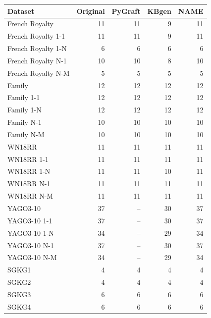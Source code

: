\begin{tabular}{lrrrr}
\toprule
Dataset & Original & PyGraft & KBgen & NAME \\
\midrule
French Royalty & 11 & 11 & 9 & 11 \\
French Royalty 1-1 & 11 & 11 & 9 & 11 \\
French Royalty 1-N & 6 & 6 & 6 & 6 \\
French Royalty N-1 & 10 & 10 & 8 & 10 \\
French Royalty N-M & 5 & 5 & 5 & 5 \\
\midrule
Family & 12 & 12 & 12 & 12 \\
Family 1-1 & 12 & 12 & 12 & 12 \\
Family 1-N & 12 & 12 & 12 & 12 \\
Family N-1 & 10 & 10 & 10 & 10 \\
Family N-M & 10 & 10 & 10 & 10 \\
\midrule
WN18RR & 11 & 11 & 11 & 11 \\
WN18RR 1-1 & 11 & 11 & 11 & 11 \\
WN18RR 1-N & 11 & 11 & 10 & 11 \\
WN18RR N-1 & 11 & 11 & 11 & 11 \\
WN18RR N-M & 11 & 11 & 11 & 11 \\
\midrule
YAGO3-10 & 37 & – & 30 & 37 \\
YAGO3-10 1-1 & 37 & – & 30 & 37 \\
YAGO3-10 1-N & 34 & – & 29 & 34 \\
YAGO3-10 N-1 & 37 & – & 30 & 37 \\
YAGO3-10 N-M & 34 & – & 29 & 34 \\
\midrule
SGKG1 & 4 & 4 & 4 & 4 \\
SGKG2 & 4 & 4 & 4 & 4 \\
SGKG3 & 6 & 6 & 6 & 6 \\
SGKG4 & 6 & 6 & 6 & 6 \\
\bottomrule
\end{tabular}
